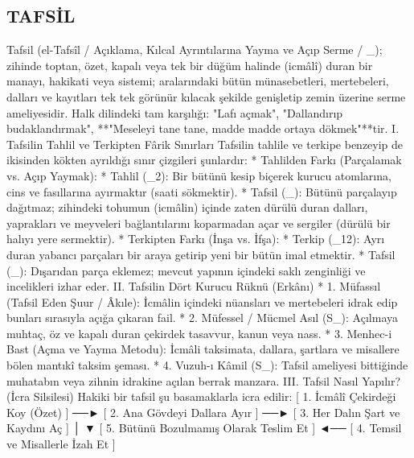 \documentclass[11pt,a4paper]{article}
\begin{document}
\subsection{TAFSİL}



Tafsil (el-Tafsîl / Açıklama, Kılcal Ayrıntılarına Yayma ve Açıp Serme / _{}); zihinde toptan, özet, kapalı veya tek bir düğüm halinde (icmâlî) duran bir manayı, hakikati veya sistemi; aralarındaki bütün münasebetleri, mertebeleri, dalları ve kayıtları tek tek görünür kılacak şekilde genişletip zemin üzerine serme ameliyesidir.
Halk dilindeki tam karşılığı: "Lafı açmak", "Dallandırıp budaklandırmak", **"Meseleyi tane tane, madde madde ortaya dökmek"**tir.
I. Tafsilin Tahlil ve Terkipten Fârik Sınırları
Tafsilin tahlile ve terkipe benzeyip de ikisinden kökten ayrıldığı sınır çizgileri şunlardır:
 * Tahlilden Farkı (Parçalamak vs. Açıp Yaymak):
   * Tahlil (_2): Bir bütünü kesip biçerek kurucu atomlarına, cins ve fasıllarına ayırmaktır (saati sökmektir).
   * Tafsil (_{}): Bütünü parçalayıp dağıtmaz; zihindeki tohumun (icmâlin) içinde zaten dürülü duran dalları, yaprakları ve meyveleri bağlantılarını koparmadan açar ve sergiler (dürülü bir halıyı yere sermektir).
 * Terkipten Farkı (İnşa vs. İfşa):
   * Terkip (_{12}): Ayrı duran yabancı parçaları bir araya getirip yeni bir bütün imal etmektir.
   * Tafsil (_{}): Dışarıdan parça eklemez; mevcut yapının içindeki saklı zenginliği ve incelikleri izhar eder.
II. Tafsilin Dört Kurucu Rüknü (Erkânı)
 * 1. Müfassıl (Tafsil Eden Şuur / Âkıle): İcmâlin içindeki nüansları ve mertebeleri idrak edip bunları sırasıyla açığa çıkaran fail.
 * 2. Müfessel / Mücmel Asıl (S_{}): Açılmaya muhtaç, öz ve kapalı duran çekirdek tasavvur, kanun veya nass.
 * 3. Menhec-i Bast (Açma ve Yayma Metodu): İcmâli taksimata, dallara, şartlara ve misallere bölen mantıkî taksim şeması.
 * 4. Vuzuh-ı Kâmil (S_{}): Tafsil ameliyesi bittiğinde muhatabın veya zihnin idrakine açılan berrak manzara.
III. Tafsil Nasıl Yapılır? (İcra Silsilesi)
Hakiki bir tafsil şu basamaklarla icra edilir:
[ 1. İcmâlî Çekirdeği Koy (Özet) ] ──► [ 2. Ana Gövdeyi Dallara Ayır ] ──► [ 3. Her Dalın Şart ve Kaydını Aç ]
                                                                                         │
                                                                                         ▼
[ 5. Bütünü Bozulmamış Olarak Teslim Et ] ◄── [ 4. Temsil ve Misallerle İzah Et ]
\end{document}
